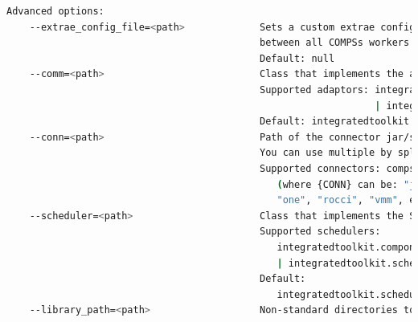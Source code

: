 \begin{lstlisting}[language=bash]
  Advanced options:                                                                                                                                                                     
    --extrae_config_file=<path>             Sets a custom extrae config file. Must be in a shared disk
                                            between all COMPSs workers.                                                      
                                            Default: null                                                                                                                               
    --comm=<path>                           Class that implements the adaptor for communications                                                                                        
                                            Supported adaptors: integratedtoolkit.nio.master.NIOAdaptor 
                                                                | integratedtoolkit.gat.master.GATAdaptor                                       
                                            Default: integratedtoolkit.nio.master.NIOAdaptor                                                                                            
    --conn=<path>                           Path of the connector jar/s that should be loaded. 
                                            You can use multiple by splitting with ':'                                               
                                            Supported connectors: compss-{CONN}-connector.jar                                                                                           
                                               (where {CONN} can be: "jclouds", "amazon", "docker", 
                                               "one", "rocci", "vmm", etc.)                                                        
    --scheduler=<path>                      Class that implements the Scheduler for COMPSs                                                                                              
                                            Supported schedulers: 
                                               integratedtoolkit.components.impl.TaskScheduler 
                                               | integratedtoolkit.scheduler.readyscheduler.ReadyScheduler           
                                            Default: 
                                               integratedtoolkit.scheduler.readyscheduler.ReadyScheduler                                                                          
    --library_path=<path>                   Non-standard directories to search for libraries (e.g. Java 

\end{lstlisting}
